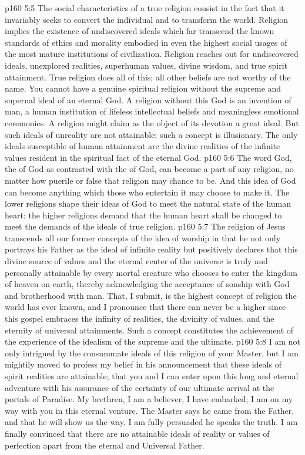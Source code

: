 \vs p160 5:5 The social characteristics of a true religion consist in the fact that it invariably seeks to convert the individual and to transform the world. Religion implies the existence of undiscovered ideals which far transcend the known standards of ethics and morality embodied in even the highest social usages of the most mature institutions of civilization. Religion reaches out for undiscovered ideals, unexplored realities, superhuman values, divine wisdom, and true spirit attainment. True religion does all of this; all other beliefs are not worthy of the name. You cannot have a genuine spiritual religion without the supreme and supernal ideal of an eternal God. A religion without this God is an invention of man, a human institution of lifeless intellectual beliefs and meaningless emotional ceremonies. A religion might claim as the object of its devotion a great ideal. But such ideals of unreality are not attainable; such a concept is illusionary. The only ideals susceptible of human attainment are the divine realities of the infinite values resident in the spiritual fact of the eternal God.
\vs p160 5:6 The word God, the  of God as contrasted with the  of God, can become a part of any religion, no matter how puerile or false that religion may chance to be. And this idea of God can become anything which those who entertain it may choose to make it. The lower religions shape their ideas of God to meet the natural state of the human heart; the higher religions demand that the human heart shall be changed to meet the demands of the ideals of true religion.
\vs p160 5:7 \pc The religion of Jesus transcends all our former concepts of the idea of worship in that he not only portrays his Father as the ideal of infinite reality but positively declares that this divine source of values and the eternal center of the universe is truly and personally attainable by every mortal creature who chooses to enter the kingdom of heaven on earth, thereby acknowledging the acceptance of sonship with God and brotherhood with man. That, I submit, is the highest concept of religion the world has ever known, and I pronounce that there can never be a higher since this gospel embraces the infinity of realities, the divinity of values, and the eternity of universal attainments. Such a concept constitutes the achievement of the experience of the idealism of the supreme and the ultimate.
\vs p160 5:8 I am not only intrigued by the consummate ideals of this religion of your Master, but I am mightily moved to profess my belief in his announcement that these ideals of spirit realities are attainable; that you and I can enter upon this long and eternal adventure with his assurance of the certainty of our ultimate arrival at the portals of Paradise. My brethren, I am a believer, I have embarked; I am on my way with you in this eternal venture. The Master says he came from the Father, and that he will show us the way. I am fully persuaded he speaks the truth. I am finally convinced that there are no attainable ideals of reality or values of perfection apart from the eternal and Universal Father.
